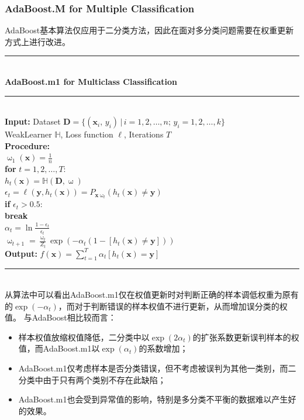 \documentclass[a4paper]{article}
\begin{document}
		\subsubsection{AdaBoost.M for Multiple Classification}
			AdaBoost基本算法仅应用于二分类方法，因此在面对多分类问题需要在权重更新方式上进行改进。\\
			\noindent\rule[0.1\baselineskip]{\textwidth}{0.75pt}\\
			\textbf{AdaBoost.m1 for Multiclass Classification}\\
			\noindent\rule[0.1\baselineskip]{\textwidth}{0.5pt}\\
			\textbf{Input:} Dataset $\textbf{D} = \{(\mathbf{x}_i,\,y_i)\,|\,i = 1, 2,\dots, n;\, y_i = 1, 2, \dots, k\}$\\
			\hspace*{32pt} WeakLearner $\mathbb{H}$, Loss function $\ell$, Iterations $T$\\
			\textbf{Procedure:} \\
					\hspace*{32pt}	$\upomega_1(\textbf{x}) = \frac{1}{n}$\\
					\hspace*{32pt}	\textbf{for} $t = 1, 2,\dots, T$: \\
							\hspace*{48pt}	$h_t(\textbf{x}) = \mathbb{H}(\textbf{D}, \upomega)$\\
							\hspace*{48pt}	$\epsilon_t = \ell(\textbf{y}, h_t(\textbf{x})) = P_{\textbf{x}~\upomega_t}(h_t(\textbf{x}) \neq \textbf{y})$\\
							\hspace*{48pt}	\textbf{if} $\epsilon_t > 0.5$: \\
							\hspace*{64pt}	\textbf{break}\\
					        \hspace*{48pt}	$\alpha_t = \ln\frac{1-\epsilon_t}{\epsilon_t}$\\
					        \hspace*{48pt}	$\upomega_{t+1} = \frac{\upomega_t}{Z_t}\exp(-\alpha_t(1-[h_t(\textbf{x})\neq \textbf{y}]))$\\
					\textbf{Output:} $f(\textbf{x}) = \sum_{t=1}^{T}\alpha_t[h_t(\textbf{x})=\textbf{y}]$\\
			\noindent\rule[0.1\baselineskip]{\textwidth}{0.75pt}\\
			从算法中可以看出AdaBoost.m1仅在权值更新时对判断正确的样本调低权重为原有的$\exp(-\alpha_t)$，而对于判断错误的样本权值不进行更新，从而增加误分类的权值。
			与AdaBoost相比较而言：
				\begin{itemize}
					\item 样本权值放缩权值降低，二分类中以$\exp(2\alpha_t)$的扩张系数更新误判样本的权值，而AdaBoost.m1以$\exp(\alpha_t)$的系数增加；
					\item AdaBoost.m1仅考虑样本是否分类错误，但不考虑被误判为其他一类别，而二分类中由于只有两个类别不存在此缺陷；
					\item AdaBoost.m1也会受到异常值的影响，特别是多分类不平衡的数据难以产生好的效果。
				\end{itemize}
\end{document}
